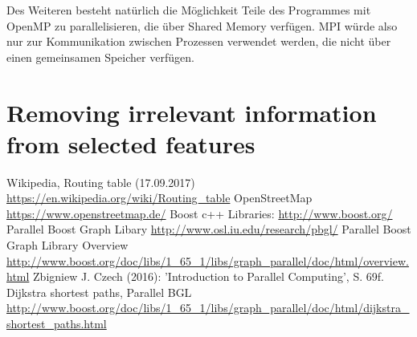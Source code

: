 \documentclass[paper=A4,pagesize=auto,12pt,headinclude=true,footinclude=true,BCOR=0mm,DIV=calc]{scrartcl}
\begin{document}
	Des Weiteren besteht natürlich die Möglichkeit Teile des Programmes mit OpenMP zu parallelisieren, die über Shared Memory verfügen. MPI würde also nur zur Kommunikation zwischen Prozessen verwendet werden, die nicht über einen gemeinsamen Speicher verfügen.
	
	\section{Removing irrelevant information from selected features}
	
	
	
	\newpage
	
	\begin{thebibliography}{xxxxxx}
		Wikipedia, Routing table  (17.09.2017) \url{https://en.wikipedia.org/wiki/Routing_table}
		 OpenStreetMap \url{https://www.openstreetmap.de/}
		 Boost c++ Libraries: \url{http://www.boost.org/}
		 Parallel Boost Graph Libary \url{http://www.osl.iu.edu/research/pbgl/}
		 Parallel Boost Graph Library Overview \url{http://www.boost.org/doc/libs/1_65_1/libs/graph_parallel/doc/html/overview.html}
		 Zbigniew J. Czech (2016): 'Introduction to Parallel Computing', S. 69f.
		 Dijkstra shortest paths, Parallel BGL \url{http://www.boost.org/doc/libs/1_65_1/libs/graph_parallel/doc/html/dijkstra_shortest_paths.html}
	\end{thebibliography}
	

	
	
\end{document}
